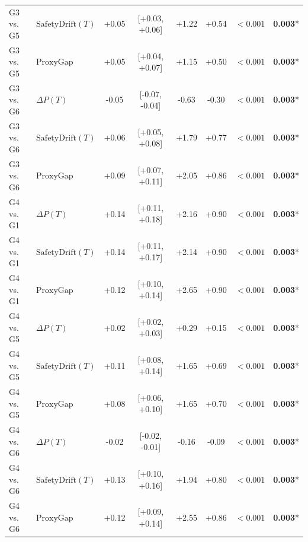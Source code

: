 \begin{table}[t]
\begin{tabular}{llcccccc}
G3 vs. G5 & $\text{SafetyDrift}(T)$ & +0.05 & [+0.03, +0.06] & +1.22 & +0.54 & $<0.001$ & \textbf{0.003}* \\
G3 vs. G5 & $\text{ProxyGap}$ & +0.05 & [+0.04, +0.07] & +1.15 & +0.50 & $<0.001$ & \textbf{0.003}* \\
G3 vs. G6 & $\Delta P(T)$ & -0.05 & [-0.07, -0.04] & -0.63 & -0.30 & $<0.001$ & \textbf{0.003}* \\
G3 vs. G6 & $\text{SafetyDrift}(T)$ & +0.06 & [+0.05, +0.08] & +1.79 & +0.77 & $<0.001$ & \textbf{0.003}* \\
G3 vs. G6 & $\text{ProxyGap}$ & +0.09 & [+0.07, +0.11] & +2.05 & +0.86 & $<0.001$ & \textbf{0.003}* \\
G4 vs. G1 & $\Delta P(T)$ & +0.14 & [+0.11, +0.18] & +2.16 & +0.90 & $<0.001$ & \textbf{0.003}* \\
G4 vs. G1 & $\text{SafetyDrift}(T)$ & +0.14 & [+0.11, +0.17] & +2.14 & +0.90 & $<0.001$ & \textbf{0.003}* \\
G4 vs. G1 & $\text{ProxyGap}$ & +0.12 & [+0.10, +0.14] & +2.65 & +0.90 & $<0.001$ & \textbf{0.003}* \\
G4 vs. G5 & $\Delta P(T)$ & +0.02 & [+0.02, +0.03] & +0.29 & +0.15 & $<0.001$ & \textbf{0.003}* \\
G4 vs. G5 & $\text{SafetyDrift}(T)$ & +0.11 & [+0.08, +0.14] & +1.65 & +0.69 & $<0.001$ & \textbf{0.003}* \\
G4 vs. G5 & $\text{ProxyGap}$ & +0.08 & [+0.06, +0.10] & +1.65 & +0.70 & $<0.001$ & \textbf{0.003}* \\
G4 vs. G6 & $\Delta P(T)$ & -0.02 & [-0.02, -0.01] & -0.16 & -0.09 & $<0.001$ & \textbf{0.003}* \\
G4 vs. G6 & $\text{SafetyDrift}(T)$ & +0.13 & [+0.10, +0.16] & +1.94 & +0.80 & $<0.001$ & \textbf{0.003}* \\
G4 vs. G6 & $\text{ProxyGap}$ & +0.12 & [+0.09, +0.14] & +2.55 & +0.86 & $<0.001$ & \textbf{0.003}* \\
\bottomrule
\end{tabular}
\end{table}
